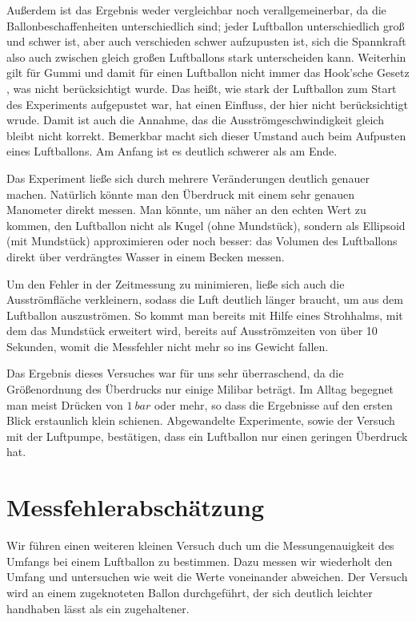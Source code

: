 \documentclass{article}
\begin{document}
        Außerdem ist das Ergebnis weder vergleichbar noch verallgemeinerbar, da die Ballonbeschaffenheiten unterschiedlich sind;
        jeder Luftballon unterschiedlich groß und schwer ist, aber auch verschieden schwer aufzupusten ist, sich die
        Spannkraft also auch zwischen gleich großen Luftballons stark unterscheiden kann.
        Weiterhin gilt für Gummi und damit für einen Luftballon nicht immer das Hook'sche Gesetz \cite{Gummi}, was nicht berücksichtigt wurde.
        Das heißt, wie stark der Luftballon zum Start des Experiments aufgepustet war, 
        hat einen Einfluss, der hier nicht berücksichtigt wrude.
        Damit ist auch die Annahme, das die Ausströmgeschwindigkeit gleich bleibt nicht korrekt.
        Bemerkbar macht sich dieser Umstand auch beim Aufpusten eines Luftballons. Am Anfang ist es deutlich schwerer als am Ende.

        Das Experiment ließe sich durch mehrere Veränderungen deutlich genauer machen.
        Natürlich könnte man den Überdruck mit einem sehr genauen Manometer direkt messen.
        Man könnte, um näher an den echten Wert zu kommen, den Luftballon nicht als Kugel (ohne Mundstück), sondern als Ellipsoid (mit Mundstück) approximieren oder noch besser: das Volumen des Luftballons direkt
        über verdrängtes Wasser in einem Becken messen.
        
        Um den Fehler in der Zeitmessung zu minimieren, ließe sich auch die Ausströmfläche verkleinern, sodass die Luft deutlich länger braucht, um aus dem Luftballon auszuströmen.
        So kommt man bereits mit Hilfe eines Strohhalms, mit dem das Mundstück erweitert wird, bereits auf Ausströmzeiten von über 10 Sekunden, womit die Messfehler nicht mehr so ins Gewicht fallen. %

        Das Ergebnis dieses Versuches war für uns sehr überraschend, da die Größenordnung des Überdrucks nur einige Milibar beträgt.
        Im Alltag begegnet man meist Drücken von \(\SI{1}{bar}\) oder mehr, so dass die Ergebnisse auf den ersten Blick erstaunlich klein schienen. 
        Abgewandelte Experimente, sowie der Versuch mit der Luftpumpe, bestätigen, dass ein Luftballon nur einen geringen Überdruck hat.

    \section{Messfehlerabschätzung}\label{Messfehler_Umfang}
        Wir führen einen weiteren kleinen Versuch duch um die Messungenauigkeit des Umfangs bei einem Luftballon zu bestimmen.
        Dazu messen wir wiederholt den Umfang und untersuchen wie weit die Werte voneinander abweichen.
        Der Versuch wird an einem zugeknoteten Ballon durchgeführt, der sich deutlich leichter handhaben lässt als ein zugehaltener.
\end{document}

